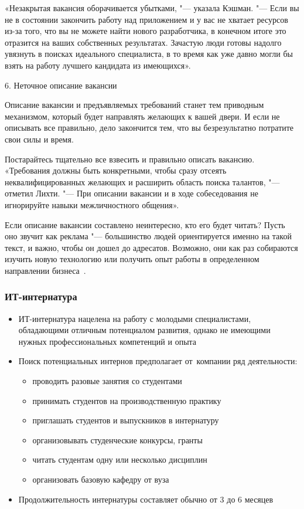 \documentclass{../industrial-development}
\begin{document}
«Незакрытая вакансия оборачивается убытками, "--- указала Кэшман. "--- Если вы не в состоянии закончить работу над приложением и у вас не хватает ресурсов из-за того, что вы не можете найти нового разработчика, в конечном итоге это отразится на ваших собственных результатах. Зачастую люди готовы надолго увязнуть в поисках идеального специалиста, в то время как уже давно могли бы взять на работу лучшего кандидата из имеющихся».

6. \alert{Неточное описание вакансии}

Описание вакансии и предъявляемых требований станет тем приводным механизмом, который будет направлять желающих к вашей двери. И если не описывать все правильно, дело закончится тем, что вы безрезультатно потратите свои силы и время.

Постарайтесь тщательно все взвесить и правильно описать вакансию. «Требования должны быть конкретными, чтобы сразу отсеять неквалифицированных желающих и рас­ширить область поиска талантов, "--- отметил Лихти. "--- При описании вакансии и в ходе собеседования не игнорируйте навыки межличностного общения».

Если описание вакансии составлено неинтересно, кто его будет читать? Пусть оно звучит как реклама "--- большинство людей ориентируется именно на такой текст, и важно, чтобы он дошел до адресатов. Возможно, они как раз собираются изучить новую технологию или получить опыт работы в определенном направлении бизнеса~\cite{RichHein}.

\begin{frame} \frametitle{ИТ-интернатура}
	\begin{itemize}
		\item ИТ-интернатура нацелена на работу с молодыми специалистами, обладающими отличным потенциалом развития, однако не имеющими нужных профессиональных компетенций и опыта
		\item Поиск потенциальных интернов предполагает от~компании ряд деятельности:
		\begin{itemize}
			\item проводить разовые занятия со студентами
			\item	принимать студентов на производственную практику
			\item	приглашать студентов и выпускников в интернатуру
			\item	организовывать студенческие конкурсы, гранты
			\item	читать студентам одну или несколько дисциплин
			\item	организовать базовую кафедру от вуза
		\end{itemize}
		\item Продолжительность интернатуры составляет обычно от 3 до 6 месяцев
	\end{itemize}
\end{frame}
\end{document}
